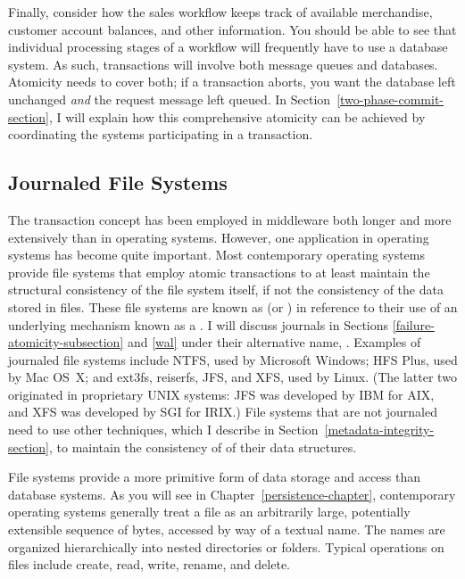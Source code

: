 Finally, consider how the sales workflow keeps track of available
merchandise, customer account balances, and other information.  You
should be able to see that individual processing stages of a workflow
will frequently have to use a database system.  As such, transactions
will involve both message queues and databases.  Atomicity needs to
cover both; if a transaction aborts, you want the database left
unchanged \emph{and} the request message left queued.  In
Section~\ref{two-phase-commit-section}, I will explain how this
comprehensive atomicity can be achieved by coordinating the systems
participating in a transaction.

\subsection{Journaled File Systems}\label{jfs-transactions-section}

The transaction concept has been employed in middleware both longer
and more extensively than in operating systems.  However, one
application in operating systems has become quite important.  Most
contemporary operating systems provide file systems that employ atomic
transactions to at least maintain the structural consistency of the
file system itself, if not the consistency of the data stored in
files.  These file systems are known as
 (or
) in reference to their use of an
underlying mechanism known as a . I will discuss
journals in Sections \ref{failure-atomicity-subsection} and \ref{wal} under their alternative name,
.  Examples of journaled file systems include NTFS, used
by Microsoft Windows; HFS Plus, used by Mac OS~X; and ext3fs, reiserfs, JFS, and XFS, used by Linux.  (The latter two
originated in proprietary UNIX systems: JFS was developed by IBM for
AIX, and XFS was developed by SGI for IRIX.)  File systems that are
not journaled need to use other techniques, which I describe in
Section~\ref{metadata-integrity-section}, to maintain the consistency of
of their data structures.

File systems provide a more primitive form of data storage and access
than database systems.  As you will see in Chapter~\ref{persistence-chapter}, contemporary
operating systems generally treat a file as an arbitrarily large,
potentially extensible sequence of bytes, accessed by way of a
textual name.  The names are organized hierarchically into nested
directories or folders.  Typical operations on files include create,
read, write, rename, and delete.

